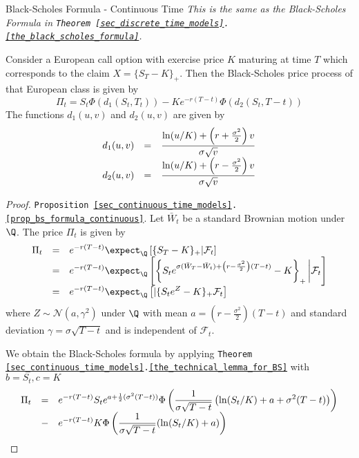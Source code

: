 \documentclass[11pt,a4paper]{article}
\begin{document}
  \begin{proposition}{Black-Scholes Formula - Continuous Time}\label{prop_bs_formula_continuous}
    \textit{This is the same as the Black-Scholes Formula in \texttt{Theorem \ref{sec_discrete_time_models}.\ref{the_black_scholes_formula}}.}
    \par Consider a European call option with exercise price $K$ maturing at time $T$ which corresponds to the claim $X=\{S_T-K\}_+$. Then the Black-Scholes price process of that European class is given by
    \[ \Pi_t=S_t\Phi(d_1(S_t,T_t))-Ke^{-r(T-t)}\Phi(d_2(S_t,T-t)) \]
    The functions $d_1(u,v)$ and $d_2(u,v)$ are given by
    \[\everymath={\displaystyle}\begin{array}{rcl}
      d_1(u,v)&=&\frac{\ln(u/K)+\left(r+\frac{\sigma^2}2\right)v}{\sigma\sqrt{v}}\\
      d_2(u,v)&=&\frac{\ln(u/K)+\left(r-\frac{\sigma^2}2\right)v}{\sigma\sqrt{v}}
    \end{array}\]
  \end{proposition}

  \begin{proof}{\texttt{Proposition \ref{sec_continuous_time_models}.\ref{prop_bs_formula_continuous}}.}
    Let $\bar{W}_t$ be a standard Brownian motion under $\Q$. The price $\Pi_t$ is given by
    \[\everymath={\displaystyle}\begin{array}{rcl}
      \Pi_t&=&e^{-r(T-t)}\expect_\Q\left[\{S_T-K\}_+|\mathcal{F}_t\right]\\
      &=&e^{-r(T-t)}\expect_\Q\left[\left\{S_t e^{\sigma(\bar{W}_T-\bar{W}_t)+\left(r-\frac{\sigma^2}2\right)(T-t)}-K\right\}_+\bigg|\mathcal{F}_t\right]\\
      &=&e^{-r(T-t)}\expect_\Q\left[|\{S_te^Z-K\}_+\mathcal{F}_t\right]
    \end{array}\]
    where $Z\sim\mathcal{N}(a,\gamma^2)$ under $\Q$ with mean $a=\left(r-\frac{\sigma^2}2\right)(T-t)$ and standard deviation $\gamma=\sigma\sqrt{T-t}$ and is independent of $\mathcal{F}_t$.
    \par We obtain the Black-Scholes formula by applying \texttt{Theorem \ref{sec_continuous_time_models}.\ref{the_technical_lemma_for_BS}} with $b=S_t,c=K$
    \[\everymath={\displaystyle}\begin{array}{rcl}
      \Pi_t&=&e^{-r(T-t)}S_te^{a+\frac12(\sigma^2(T-t))}\Phi\left(\frac1{\sigma\sqrt{T-t}}\left(\ln(S_t/K)+a+\sigma^2(T-t)\right)\right)\\
      &-&e^{-r(T-t)}K\Phi\left(\frac1{\sigma\sqrt{T-t}}(\ln(S_t/K)+a)\right)
    \end{array}\]
    \proved
  \end{proof}
\end{document}
